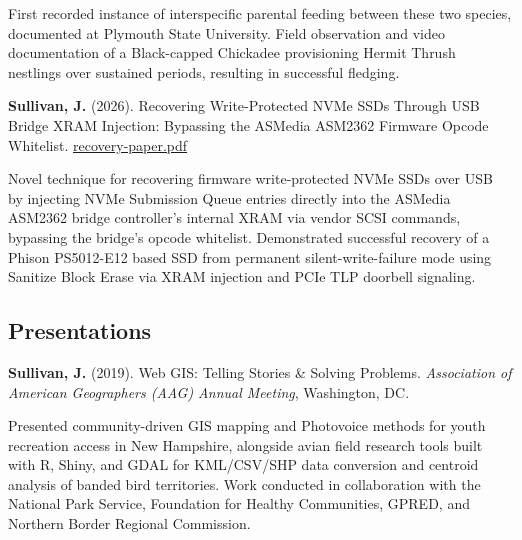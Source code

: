 \documentclass[11pt,letterpaper]{article}
\newcommand{\cvlink}[2]{\href{#1}{\color{linkcolor}#2}}
\begin{document}
\vspace{0.3em}
\noindent First recorded instance of interspecific parental feeding between these two species, documented at Plymouth State University. Field observation and video documentation of a Black-capped Chickadee provisioning Hermit Thrush nestlings over sustained periods, resulting in successful fledging.

\vspace{0.8em}

\textbf{Sullivan, J.} (2026). Recovering Write-Protected NVMe SSDs Through USB Bridge XRAM Injection: Bypassing the ASMedia ASM2362 Firmware Opcode Whitelist. \cvlink{https://transscendsurvival.org/papers/recovery-paper.pdf}{recovery-paper.pdf}

\vspace{0.3em}
\noindent Novel technique for recovering firmware write-protected NVMe SSDs over USB by injecting NVMe Submission Queue entries directly into the ASMedia ASM2362 bridge controller's internal XRAM via vendor SCSI commands, bypassing the bridge's opcode whitelist. Demonstrated successful recovery of a Phison PS5012-E12 based SSD from permanent silent-write-failure mode using Sanitize Block Erase via XRAM injection and PCIe TLP doorbell signaling.

\vspace{1em}
\subsection{Presentations}

\textbf{Sullivan, J.} (2019). Web GIS: Telling Stories \& Solving Problems. \textit{Association of American Geographers (AAG) Annual Meeting}, Washington, DC.

\vspace{0.3em}
\noindent Presented community-driven GIS mapping and Photovoice methods for youth recreation access in New Hampshire, alongside avian field research tools built with R, Shiny, and GDAL for KML/CSV/SHP data conversion and centroid analysis of banded bird territories. Work conducted in collaboration with the National Park Service, Foundation for Healthy Communities, GPRED, and Northern Border Regional Commission.

\newpage

\end{document}
